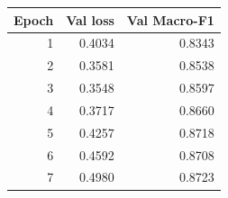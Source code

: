 \begin{tabular}{rrr}\toprule Epoch & Val loss & Val Macro-F1\\\midrule
1 & 0.4034 & 0.8343\\
2 & 0.3581 & 0.8538\\
3 & 0.3548 & 0.8597\\
4 & 0.3717 & 0.8660\\
5 & 0.4257 & 0.8718\\
6 & 0.4592 & 0.8708\\
7 & 0.4980 & 0.8723\\
\bottomrule\end{tabular}

